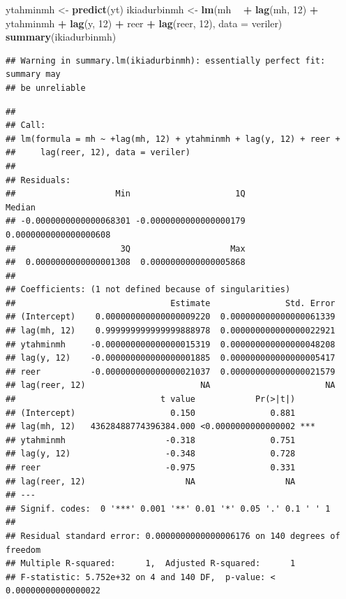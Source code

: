 \documentclass[]{article}
\newenvironment{Shaded}{\begin{snugshade}}{\end{snugshade}}
\newcommand{\KeywordTok}[1]{\textcolor[rgb]{0.13,0.29,0.53}{\textbf{#1}}}
\newcommand{\DataTypeTok}[1]{\textcolor[rgb]{0.13,0.29,0.53}{#1}}
\newcommand{\DecValTok}[1]{\textcolor[rgb]{0.00,0.00,0.81}{#1}}
\newcommand{\StringTok}[1]{\textcolor[rgb]{0.31,0.60,0.02}{#1}}
\newcommand{\OperatorTok}[1]{\textcolor[rgb]{0.81,0.36,0.00}{\textbf{#1}}}
\newcommand{\NormalTok}[1]{#1}
\begin{document}
\begin{Shaded}
\begin{Highlighting}[]
\NormalTok{ytahminmh <-}\StringTok{ }\KeywordTok{predict}\NormalTok{(yt)}
\NormalTok{ikiadurbinmh <-}\StringTok{ }\KeywordTok{lm}\NormalTok{(mh }\OperatorTok{~}\StringTok{ }\OperatorTok{+}\StringTok{ }\KeywordTok{lag}\NormalTok{(mh, }\DecValTok{12}\NormalTok{) }\OperatorTok{+}\StringTok{ }\NormalTok{ytahminmh }\OperatorTok{+}\StringTok{ }\KeywordTok{lag}\NormalTok{(y, }\DecValTok{12}\NormalTok{) }\OperatorTok{+}\StringTok{ }\NormalTok{reer }\OperatorTok{+}\StringTok{ }\KeywordTok{lag}\NormalTok{(reer, }\DecValTok{12}\NormalTok{), }\DataTypeTok{data =}\NormalTok{ veriler)}
\KeywordTok{summary}\NormalTok{(ikiadurbinmh)}
\end{Highlighting}
\end{Shaded}

\begin{verbatim}
## Warning in summary.lm(ikiadurbinmh): essentially perfect fit: summary may
## be unreliable
\end{verbatim}

\begin{verbatim}
## 
## Call:
## lm(formula = mh ~ +lag(mh, 12) + ytahminmh + lag(y, 12) + reer + 
##     lag(reer, 12), data = veriler)
## 
## Residuals:
##                    Min                     1Q                 Median 
## -0.0000000000000068301 -0.0000000000000000179  0.0000000000000000608 
##                     3Q                    Max 
##  0.0000000000000001308  0.0000000000000005868 
## 
## Coefficients: (1 not defined because of singularities)
##                               Estimate               Std. Error
## (Intercept)    0.000000000000000009220  0.000000000000000061339
## lag(mh, 12)    0.999999999999999888978  0.000000000000000022921
## ytahminmh     -0.000000000000000015319  0.000000000000000048208
## lag(y, 12)    -0.000000000000000001885  0.000000000000000005417
## reer          -0.000000000000000021037  0.000000000000000021579
## lag(reer, 12)                       NA                       NA
##                             t value            Pr(>|t|)    
## (Intercept)                   0.150               0.881    
## lag(mh, 12)   43628488774396384.000 <0.0000000000000002 ***
## ytahminmh                    -0.318               0.751    
## lag(y, 12)                   -0.348               0.728    
## reer                         -0.975               0.331    
## lag(reer, 12)                    NA                  NA    
## ---
## Signif. codes:  0 '***' 0.001 '**' 0.01 '*' 0.05 '.' 0.1 ' ' 1
## 
## Residual standard error: 0.0000000000000006176 on 140 degrees of freedom
## Multiple R-squared:      1,  Adjusted R-squared:      1 
## F-statistic: 5.752e+32 on 4 and 140 DF,  p-value: < 0.00000000000000022
\end{verbatim}
\end{document}
